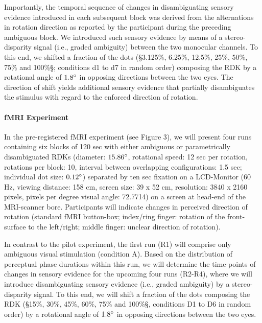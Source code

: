 \documentclass[12pt]{article}
\begin{document}
Importantly, the temporal sequence of changes in disambiguating sensory evidence introduced in each subsequent block was derived from the alternations in rotation direction as reported by the participant during the preceding ambiguous block. We introduced such sensory evidence by means of a stereo-disparity signal (i.e., graded ambiguity) between the two monocular channels. To this end, we shifted a fraction of the dots (§3.125\%, 6.25\%, 12.5\%, 25\%, 50\%, 75\% and 100\%§; conditions d1 to d7 in random order) composing the RDK by a rotational angle of $1.8\degree$ in opposing directions between the two eyes. The direction of shift yields additional sensory evidence that partially disambiguates the stimulus with regard to the enforced direction of rotation. 

\paragraph{fMRI Experiment}

In the pre-registered fMRI experiment (see Figure 3), we will present four runs containing six blocks of 120 sec with either ambiguous or parametrically disambiguated RDKs (diameter: $15.86\degree$, rotational speed: 12 sec per rotation, rotations per block: 10, interval between overlapping configurations: 1.5 sec; individual dot size: $0.12\degree$) separated by ten sec fixation on a LCD-Monitor (60 Hz, viewing distance: 158 cm, screen size: 39 x 52 cm, resolution: 3840 x 2160 pixels, pixels per degree visual angle: 72.7714) on a screen at head-end of the MRI-scanner bore. Participants will indicate changes in perceived direction of rotation (standard fMRI button-box; index/ring finger: rotation of the front-surface to the left/right; middle finger: unclear direction of rotation).

In contrast to the pilot experiment, the first run (R1) will comprise only ambiguous visual stimulation (condition A).  Based on the distribution of perceptual phase durations within this run, we will determine the time-points of changes in sensory evidence for the upcoming four runs (R2-R4), where we will introduce disambiguating sensory evidence (i.e., graded ambiguity) by a stereo-disparity signal. To this end, we will shift a fraction of the dots composing the RDK (§15\%, 30\%, 45\%, 60\%, 75\% and 100\%§, conditions D1 to D6 in random order) by a rotational angle of $1.8\degree$ in opposing directions between the two eyes.
\end{document}
